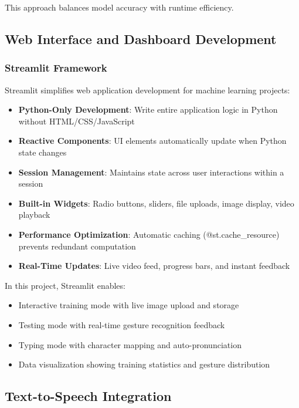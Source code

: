This approach balances model accuracy with runtime efficiency.

\subsection{Web Interface and Dashboard Development}

\subsubsection{Streamlit Framework}

Streamlit simplifies web application development for machine learning projects:

\begin{itemize}
    \item \textbf{Python-Only Development}: Write entire application logic in Python without HTML/CSS/JavaScript
    \item \textbf{Reactive Components}: UI elements automatically update when Python state changes
    \item \textbf{Session Management}: Maintains state across user interactions within a session
    \item \textbf{Built-in Widgets}: Radio buttons, sliders, file uploads, image display, video playback
    \item \textbf{Performance Optimization}: Automatic caching (@st.cache\_resource) prevents redundant computation
    \item \textbf{Real-Time Updates}: Live video feed, progress bars, and instant feedback
\end{itemize}

In this project, Streamlit enables:
\begin{itemize}
    \item Interactive training mode with live image upload and storage
    \item Testing mode with real-time gesture recognition feedback
    \item Typing mode with character mapping and auto-pronunciation
    \item Data visualization showing training statistics and gesture distribution
\end{itemize}

\subsection{Text-to-Speech Integration}

